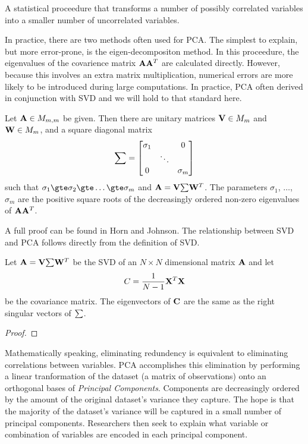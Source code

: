 \begin{definition}
  A statistical proceedure that transforms a number of possibly correlated variables into a smaller number of uncorrelated variables.
\end{definition}

In practice, there are two methods often used for \gls{PCA}.  The simplest to explain, but more error-prone, is the eigen-decompositon
method\cite{}.  In this proceedure, the eigenvalues of the covarience matrix $\mathbf{A}\mathbf{A}^T$ are calculated directly.  However,
because this involves an extra matrix multiplication, numerical errors are more likely to be introduced during large computations.
In practice, \gls{PCA} often derived in conjunction with \gls{SVD} and we will hold to that standard here.

\begin{theorem}
  Let $\mathbf{A} \in M_{m,m}$ be given. Then there are unitary matrices $\mathbf{V} \in M_m$ and $\mathbf{W} \in M_m$, and a square diagonal
  matrix
  \[
    \mathbf{\sum} =
      \begin{bmatrix}
        \sigma_1 &        & 0        \\
                 & \ddots &          \\
        0        &        & \sigma_m \\
      \end{bmatrix}
  \]
  such that $\sigma_1 \gte \sigma_2 \gte \hdots \gte \sigma_m$ and $\mathbf{A} = \mathbf{V}\mathbf{\sum}\mathbf{W}^T$.  The parameters $\sigma_1$,
  $\hdots$, $\sigma_m$ are the positive square roots of the decreasingly ordered non-zero eigenvalues of $\mathbf{A}\mathbf{A}^T$.
\end{theorem}

A full proof can be found in Horn and Johnson\cite{horn2013}.  The relationship between \gls{SVD} and \gls{PCA} follows directly from the
definition of \gls{SVD}.

\begin{theorem}
  Let $\mathbf{A} = \mathbf{V}\mathbf{\sum}\mathbf{W}^T$ be the \gls{SVD} of an $N \times N$ dimensional matrix $\mathbf{A}$ and let \[C = \frac{1}{N - 1}
    \mathbf{X}^T\mathbf{X}\] be the covariance matrix.  The eigenvectors of $\mathbf{C}$ are the same as the right singular vectors of $\mathbf{\sum}$.
\end{theorem}

\begin{proof}
\end{proof}


Mathematically speaking, eliminating redundency is equivalent to eliminating correlations between variables.  \gls{PCA} accomplishes this
elimination by performing a linear tranformation of the dataset (a matrix of observations) onto an orthogonal bases of \textit{Principal Components}.
Components are decreasingly ordered by the amount of the original dataset's variance they capture.  The hope is that the majority of
the dataset's variance will be captured in a small number of principal components.  Researchers then seek to explain what variable or
combination of variables are encoded in each principal component.
